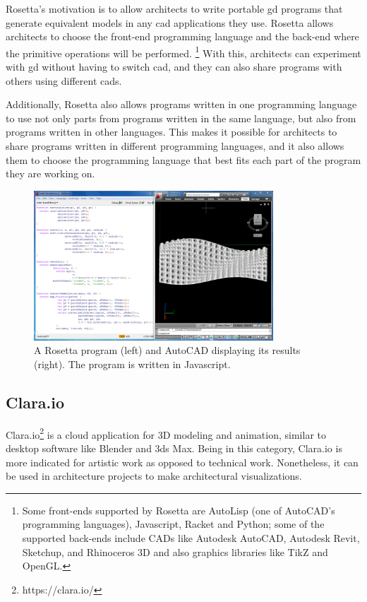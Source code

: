 Rosetta's motivation is to allow architects to write portable \gls{gd} programs that generate equivalent models in any \gls{cad} applications they use.
Rosetta allows architects to choose the front-end programming language and the back-end where the primitive operations will be performed\cite{de2012modern}.%
\footnote{Some front-ends supported by Rosetta are AutoLisp (one of AutoCAD's programming languages), Javascript, Racket and Python; some of the supported back-ends include CADs like Autodesk AutoCAD, Autodesk Revit, Sketchup, and Rhinoceros 3D and also graphics libraries like TikZ and OpenGL.}
With this, architects can experiment with \gls{gd} without having to switch \gls{cad}, and they can also share programs with others using different \glspl{cad}.

Additionally, Rosetta also allows programs written in one programming language to use not only parts from programs written in the same language, but also from programs written in other languages.
This makes it possible for architects to share programs written in different programming languages, and it also allows them to choose the programming language that best fits each part of the program they are working on.

\begin{figure}
	\centering
	\includegraphics[width=0.8\textwidth]{images/rosetta_js_autocad}
	\caption{A Rosetta program (left) and AutoCAD displaying its results (right). The program is written in Javascript.}
	\label{fig:rosetta:ex}
\end{figure}


\subsection{Clara.io}
Clara.io\footnote{https://clara.io/}\cite{houston2013clara} is a cloud application for 3D modeling and animation, similar to desktop software like Blender and 3ds Max.
Being in this category, Clara.io is more indicated for artistic work as opposed to technical work.
Nonetheless, it can be used in architecture projects to make architectural visualizations.

